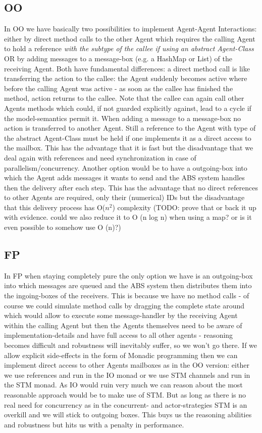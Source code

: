 \subsection{OO}
In OO we have basically two possibilities to implement Agent-Agent Interactions: either by direct method calls to the other Agent which requires the calling Agent to hold a reference \textit{with the subtype of the callee if using an abstract Agent-Class} OR by adding messages to a message-box (e.g. a HashMap or List) of the receiving Agent. Both have fundamental differences: a direct method call is like transferring the action to the callee: the Agent suddenly becomes active where before the calling Agent was active - as soon as the callee has finished the method, action returns to the callee. Note that the callee can again call other Agents methods which could, if not guarded explicitly against, lead to a cycle if the model-semantics permit it.
When adding a message to a message-box no action is transferred to another Agent. Still a reference to the Agent with type of the abstract Agent-Class must be held if one implements it as a direct access to the mailbox. This has the advantage that it is fast but the disadvantage that we deal again with references and need synchronization in case of parallelism/concurrency. Another option would be to have a outgoing-box into which the Agent adds messages it wants to send and the ABS system handles then the delivery after each step. This has the advantage that no direct references to other Agents are required, only their (numerical) IDs but the disadvantage that this delivery process has O($n^2$) complexity (TODO: prove that or back it up with evidence. could we also reduce it to O (n log n) when using a map? or is it even possible to somehow use O (n)?)
\subsection{FP}
In FP when staying completely pure the only option we have is an outgoing-box into which messages are queued and the ABS system then distributes them into the ingoing-boxes of the receivers. This is because we have no method calls - of course we could simulate method calls by dragging the complete state around which would allow to execute some message-handler by the receiving Agent within the calling Agent but then the Agents themselves need to be aware of implementation-details and have full access to all other agents - reasoning becomes difficult and robustness will inevitably suffer, so we won't go there.
If we allow explicit side-effects in the form of Monadic programming then we can implement direct access to other Agents mailboxes as in the OO version: either we use references and run in the IO monad or we use STM channels and run in the STM monad. As IO would ruin very much we can reason about the most reasonable approach would be to make use of STM. But as long as there is no real need for concurrency as in the concurrent- and actor-strategies STM is an overkill and we will stick to outgoing boxes. This buys us the reasoning abilities and robustness but hits us with a penalty in performance.

